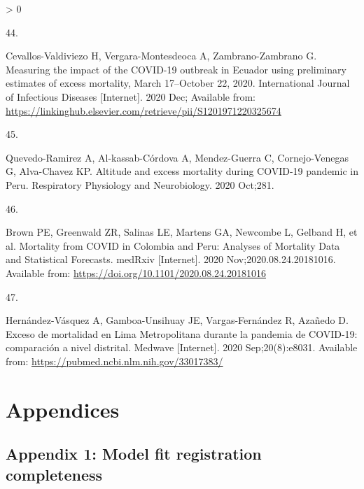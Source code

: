 \documentclass[
]{article}
\newlength{\cslhangindent}
\newlength{\csllabelwidth}
\newenvironment{CSLReferences}[2] %
 {%
  \setlength{\parindent}{0pt}
  \ifodd #1 \everypar{\setlength{\hangindent}{\cslhangindent}}\ignorespaces\fi
  \ifnum #2 > 0
  \setlength{\parskip}{#2\baselineskip}
  \fi
 }%
 {}
\newcommand{\CSLLeftMargin}[1]{\parbox[t]{\csllabelwidth}{#1}}
\newcommand{\CSLRightInline}[1]{\parbox[t]{\linewidth - \csllabelwidth}{#1}\break}
\begin{document}
\begin{CSLReferences}{0}{0}
\leavevmode\hypertarget{ref-Cevallos2020}{}%
\CSLLeftMargin{44. }
\CSLRightInline{Cevallos-Valdiviezo H, Vergara-Montesdeoca A, Zambrano-Zambrano G. {Measuring the impact of the COVID-19 outbreak in Ecuador using preliminary estimates of excess mortality, March 17--October 22, 2020}. International Journal of Infectious Diseases {[}Internet{]}. 2020 Dec; Available from: \url{https://linkinghub.elsevier.com/retrieve/pii/S1201971220325674}}

\leavevmode\hypertarget{ref-Quevedo2020}{}%
\CSLLeftMargin{45. }
\CSLRightInline{Quevedo-Ramirez A, Al-kassab-Córdova A, Mendez-Guerra C, Cornejo-Venegas G, Alva-Chavez KP. {Altitude and excess mortality during COVID-19 pandemic in Peru}. Respiratory Physiology and Neurobiology. 2020 Oct;281. }

\leavevmode\hypertarget{ref-Brown2020}{}%
\CSLLeftMargin{46. }
\CSLRightInline{Brown PE, Greenwald ZR, Salinas LE, Martens GA, Newcombe L, Gelband H, et al. {Mortality from COVID in Colombia and Peru: Analyses of Mortality Data and Statistical Forecasts}. medRxiv {[}Internet{]}. 2020 Nov;2020.08.24.20181016. Available from: \url{https://doi.org/10.1101/2020.08.24.20181016}}

\leavevmode\hypertarget{ref-Hernandez2020}{}%
\CSLLeftMargin{47. }
\CSLRightInline{Hernández-Vásquez A, Gamboa-Unsihuay JE, Vargas-Fernández R, Azañedo D. {Exceso de mortalidad en Lima Metropolitana durante la pandemia de COVID-19: comparaci{ó}n a nivel distrital}. Medwave {[}Internet{]}. 2020 Sep;20(8):e8031. Available from: \url{https://pubmed.ncbi.nlm.nih.gov/33017383/}}

\end{CSLReferences}

\hypertarget{appendices}{%
\section{Appendices}\label{appendices}}

\hypertarget{appendix-1-model-fit-registration-completeness}{%
\subsection{Appendix 1: Model fit registration completeness}\label{appendix-1-model-fit-registration-completeness}}
\end{document}
